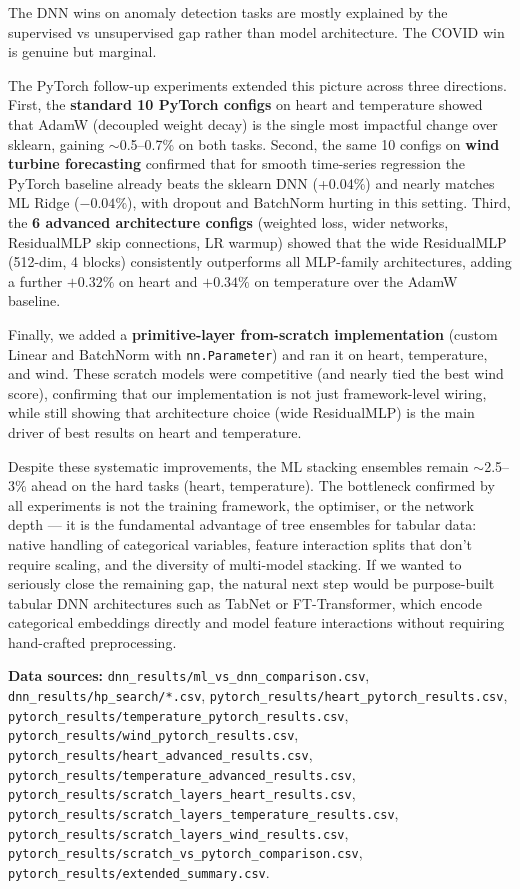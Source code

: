 \documentclass[11pt,a4paper]{article}
\begin{document}
The DNN wins on anomaly detection tasks are mostly explained by the supervised vs unsupervised gap rather than model architecture. The COVID win is genuine but marginal.

The PyTorch follow-up experiments extended this picture across three directions.
First, the \textbf{standard 10 PyTorch configs} on heart and temperature showed that AdamW (decoupled weight decay) is the single most impactful change over sklearn, gaining $\sim$0.5--0.7\% on both tasks.
Second, the same 10 configs on \textbf{wind turbine forecasting} confirmed that for smooth time-series regression the PyTorch baseline already beats the sklearn DNN (+0.04\%) and nearly matches ML Ridge ($-0.04\%$), with dropout and BatchNorm hurting in this setting.
Third, the \textbf{6 advanced architecture configs} (weighted loss, wider networks, ResidualMLP skip connections, LR warmup) showed that the wide ResidualMLP (512-dim, 4 blocks) consistently outperforms all MLP-family architectures, adding a further $+0.32\%$ on heart and $+0.34\%$ on temperature over the AdamW baseline.

Finally, we added a \textbf{primitive-layer from-scratch implementation} (custom Linear and BatchNorm with \texttt{nn.Parameter}) and ran it on heart, temperature, and wind.
These scratch models were competitive (and nearly tied the best wind score), confirming that our implementation is not just framework-level wiring, while still showing that architecture choice (wide ResidualMLP) is the main driver of best results on heart and temperature.

Despite these systematic improvements, the ML stacking ensembles remain $\sim$2.5--3\% ahead on the hard tasks (heart, temperature).
The bottleneck confirmed by all experiments is not the training framework, the optimiser, or the network depth --- it is the fundamental advantage of tree ensembles for tabular data: native handling of categorical variables, feature interaction splits that don't require scaling, and the diversity of multi-model stacking.
If we wanted to seriously close the remaining gap, the natural next step would be purpose-built tabular DNN architectures such as TabNet or FT-Transformer, which encode categorical embeddings directly and model feature interactions without requiring hand-crafted preprocessing.

\vspace{0.5em}
\noindent\textbf{Data sources:} \texttt{dnn\_results/ml\_vs\_dnn\_comparison.csv}, \texttt{dnn\_results/hp\_search/*.csv}, \texttt{pytorch\_results/heart\_pytorch\_results.csv}, \texttt{pytorch\_results/temperature\_pytorch\_results.csv}, \texttt{pytorch\_results/wind\_pytorch\_results.csv}, \texttt{pytorch\_results/heart\_advanced\_results.csv}, \texttt{pytorch\_results/temperature\_advanced\_results.csv}, \texttt{pytorch\_results/scratch\_layers\_heart\_results.csv}, \texttt{pytorch\_results/scratch\_layers\_temperature\_results.csv}, \texttt{pytorch\_results/scratch\_layers\_wind\_results.csv}, \texttt{pytorch\_results/scratch\_vs\_pytorch\_comparison.csv}, \texttt{pytorch\_results/extended\_summary.csv}.
\end{document}
